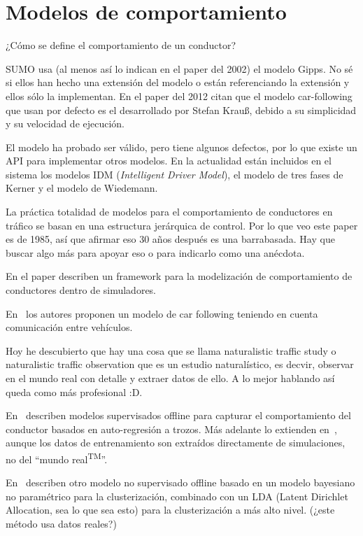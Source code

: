 \section{Modelos de comportamiento}

¿Cómo se define el comportamiento de un conductor?

SUMO usa (al menos así lo indican en el paper del 2002) el modelo Gipps\cite{krajzewicz2002sumo}. No sé si ellos han hecho una extensión del modelo o están referenciando la extensión y ellos sólo la implementan. En el paper del 2012 citan que el modelo car-following que usan por defecto es el desarrollado por Stefan Krauß\cite{jin2016evaluation}, debido a su simplicidad y su velocidad de ejecución.

El modelo ha probado ser válido, pero tiene algunos defectos, por lo que existe un API para implementar otros modelos. En la actualidad están incluidos en el sistema los modelos IDM\cite{treiber2000congested} (\textit{Intelligent Driver Model}), el modelo de tres fases de Kerner\cite{kerner2008testbed} y el modelo de Wiedemann\cite{wiedemann1974simulation}.

La práctica totalidad de modelos para el comportamiento de conductores en tráfico se basan en una estructura jerárquica de control\cite{michon1985critical}. Por lo que veo este paper es de 1985, así que afirmar eso 30 años después es una barrabasada. Hay que buscar algo más para apoyar eso o para indicarlo como una anécdota.

En el paper \cite{al2001framework} describen un framework para la modelización de comportamiento de conductores dentro de simuladores.

En~\cite{tang2014new} los autores proponen un modelo de car following teniendo en cuenta comunicación entre vehículos.

\TODO Hoy he descubierto que hay una cosa que se llama naturalistic traffic study o naturalistic traffic observation que es un estudio naturalístico, es decvir, observar en el mundo real con detalle y extraer datos de ello. A lo mejor hablando así queda como más profesional :D.

En~\cite{sekizawa2007modeling} describen modelos supervisados offline para capturar el comportamiento del conductor basados en auto-regresión a trozos. Más adelante lo extienden en~\cite{terada2010multi}, aunque los datos de entrenamiento son extraídos directamente de simulaciones, no del \enquote{mundo real\textsuperscript{TM}}.

En~\cite{bando2013unsupervised} describen otro modelo no supervisado offline basado en un modelo bayesiano no paramétrico para la clusterización, combinado con un LDA (Latent Dirichlet Allocation, sea lo que sea esto) para la clusterización a más alto nivel. (\TODO ¿este método usa datos reales?)

